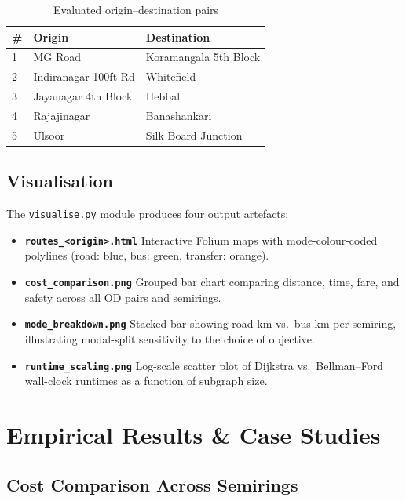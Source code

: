 \documentclass[12pt,a4paper]{article}
\begin{document}
\begin{table}[H]
\centering
\caption{Evaluated origin--destination pairs}
\label{tab:od-pairs}
\begin{tabular}{lll}
\toprule
\textbf{\#} & \textbf{Origin} & \textbf{Destination} \\
\midrule
1 & MG Road               & Koramangala 5th Block \\
2 & Indiranagar 100ft Rd  & Whitefield \\
3 & Jayanagar 4th Block   & Hebbal \\
4 & Rajajinagar           & Banashankari \\
5 & Ulsoor                & Silk Board Junction \\
\bottomrule
\end{tabular}
\end{table}

\subsection{Visualisation}

The \texttt{visualise.py} module produces four output artefacts:
\begin{itemize}[noitemsep]
  \item \textbf{\texttt{routes\_<origin>.html}}  Interactive Folium maps
        with mode-colour-coded polylines (road: blue, bus: green,
        transfer: orange).
  \item \textbf{\texttt{cost\_comparison.png}}  Grouped bar chart comparing
        distance, time, fare, and safety across all OD pairs and semirings.
  \item \textbf{\texttt{mode\_breakdown.png}}  Stacked bar showing road km
        vs.\ bus km per semiring, illustrating modal-split sensitivity to
        the choice of objective.
  \item \textbf{\texttt{runtime\_scaling.png}}  Log-scale scatter plot of
        Dijkstra vs.\ Bellman--Ford wall-clock runtimes as a function of
        subgraph size.
\end{itemize}

\section{Empirical Results \& Case Studies}
\label{sec:results}

\subsection{Cost Comparison Across Semirings}
\end{document}
